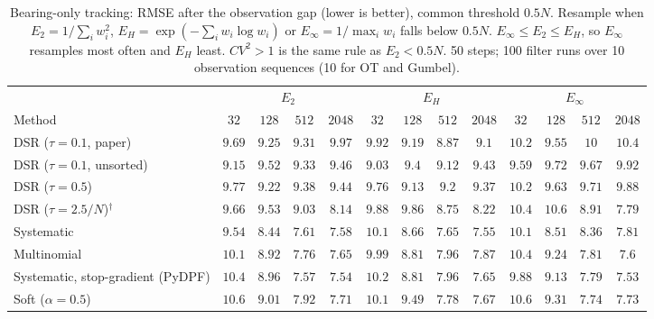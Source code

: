 \begin{table}[ht]
\centering
\small
\caption{Bearing-only tracking: RMSE after the observation gap (lower is better), common threshold $0.5N$. Resample when $E_2=1/\sum_iw_i^2$, $E_H=\exp(-\sum_iw_i\log w_i)$ or $E_\infty=1/\max_iw_i$ falls below $0.5N$. $E_\infty\le E_2\le E_H$, so $E_\infty$ resamples most often and $E_H$ least. $CV^2>1$ is the same rule as $E_2<0.5N$. 50 steps; 100 filter runs over 10 observation sequences (10 for OT and Gumbel).}
\label{tab:trigger-fixed-bearing-post_occlusion_rmse}
\begin{adjustbox}{max width=\linewidth}
\begin{tabular}{lcccc|cccc|cccc}
\toprule
 & \multicolumn{4}{c}{$E_2$} & \multicolumn{4}{c}{$E_H$} & \multicolumn{4}{c}{$E_\infty$} \\
\cmidrule(lr){2-5} \cmidrule(lr){6-9} \cmidrule(lr){10-13}
Method & $32$ & $128$ & $512$ & $2048$ & $32$ & $128$ & $512$ & $2048$ & $32$ & $128$ & $512$ & $2048$ \\
\midrule
DSR ($\tau{=}0.1$, paper) & $\mathbf{9.69}$ & $9.25$ & $9.31$ & $9.97$ & $9.92$ & $\mathbf{9.19}$ & $\mathbf{8.87}$ & $\mathbf{9.1}$ & $10.2$ & $9.55$ & $10$ & $10.4$ \\
DSR ($\tau{=}0.1$, unsorted) & $9.15$ & $9.52$ & $9.33$ & $9.46$ & $\mathbf{9.03}$ & $\mathbf{9.4}$ & $\mathbf{9.12}$ & $\mathbf{9.43}$ & $9.59$ & $9.72$ & $9.67$ & $9.92$ \\
DSR ($\tau{=}0.5$) & $9.77$ & $9.22$ & $9.38$ & $9.44$ & $\mathbf{9.76}$ & $\mathbf{9.13}$ & $\mathbf{9.2}$ & $\mathbf{9.37}$ & $10.2$ & $9.63$ & $9.71$ & $9.88$ \\
DSR ($\tau{=}2.5/N$)$^\dagger$ & $\mathbf{9.66}$ & $\mathbf{9.53}$ & $9.03$ & $8.14$ & $9.88$ & $9.86$ & $\mathbf{8.75}$ & $8.22$ & $10.4$ & $10.6$ & $8.91$ & $\mathbf{7.79}$ \\
\midrule
Systematic & $\mathbf{9.54}$ & $\mathbf{8.44}$ & $\mathbf{7.61}$ & $7.58$ & $10.1$ & $8.66$ & $7.65$ & $\mathbf{7.55}$ & $10.1$ & $8.51$ & $8.36$ & $7.81$ \\
Multinomial & $10.1$ & $8.92$ & $\mathbf{7.76}$ & $7.65$ & $\mathbf{9.99}$ & $\mathbf{8.81}$ & $7.96$ & $7.87$ & $10.4$ & $9.24$ & $7.81$ & $\mathbf{7.6}$ \\
Systematic, stop-gradient (PyDPF) & $10.4$ & $8.96$ & $\mathbf{7.57}$ & $7.54$ & $10.2$ & $\mathbf{8.81}$ & $7.96$ & $7.65$ & $\mathbf{9.88}$ & $9.13$ & $7.79$ & $\mathbf{7.53}$ \\
Soft ($\alpha{=}0.5$) & $10.6$ & $\mathbf{9.01}$ & $7.92$ & $7.71$ & $\mathbf{10.1}$ & $9.49$ & $7.78$ & $\mathbf{7.67}$ & $10.6$ & $9.31$ & $\mathbf{7.74}$ & $7.73$ \\

\end{tabular}
\end{adjustbox}
\end{table}
